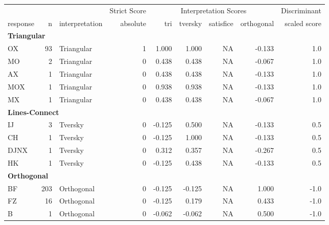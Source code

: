 \documentclass[
  letterpaper,
  DIV=11,
  numbers=noendperiod]{scrreprt}
\begin{document}
\begin{tabular}[t]{l|r|l|r|r|r|r|r|r}
\hline
\multicolumn{3}{c|}{ } & \multicolumn{1}{c|}{Strict Score} & \multicolumn{4}{c|}{Interpretation Scores} & \multicolumn{1}{c}{Discriminant} \\
\cline{4-4} \cline{5-8} \cline{9-9}
response & n & interpretation & absolute & tri & tversky & satisfice & orthogonal & scaled score\\
\hline
\multicolumn{9}{l}{\textbf{Triangular}}\\
\hline
\hspace{1em}OX & 93 & Triangular & 1 & 1.000 & 1.000 & NA & -0.133 & 1.0\\
\hline
\hspace{1em}MO & 2 & Triangular & 0 & 0.438 & 0.438 & NA & -0.067 & 1.0\\
\hline
\hspace{1em}AX & 1 & Triangular & 0 & 0.438 & 0.438 & NA & -0.133 & 1.0\\
\hline
\hspace{1em}MOX & 1 & Triangular & 0 & 0.938 & 0.938 & NA & -0.133 & 1.0\\
\hline
\hspace{1em}MX & 1 & Triangular & 0 & 0.438 & 0.438 & NA & -0.067 & 1.0\\
\hline
\multicolumn{9}{l}{\textbf{Lines-Connect}}\\
\hline
\hspace{1em}IJ & 3 & Tversky & 0 & -0.125 & 0.500 & NA & -0.133 & 0.5\\
\hline
\hspace{1em}CH & 1 & Tversky & 0 & -0.125 & 1.000 & NA & -0.133 & 0.5\\
\hline
\hspace{1em}DJNX & 1 & Tversky & 0 & 0.312 & 0.357 & NA & -0.267 & 0.5\\
\hline
\hspace{1em}HK & 1 & Tversky & 0 & -0.125 & 0.438 & NA & -0.133 & 0.5\\
\hline
\multicolumn{9}{l}{\textbf{Orthogonal}}\\
\hline
\hspace{1em}BF & 203 & Orthogonal & 0 & -0.125 & -0.125 & NA & 1.000 & -1.0\\
\hline
\hspace{1em}FZ & 16 & Orthogonal & 0 & -0.125 & 0.179 & NA & 0.433 & -1.0\\
\hline
\hspace{1em}B & 1 & Orthogonal & 0 & -0.062 & -0.062 & NA & 0.500 & -1.0\\

\end{tabular}
\end{document}
